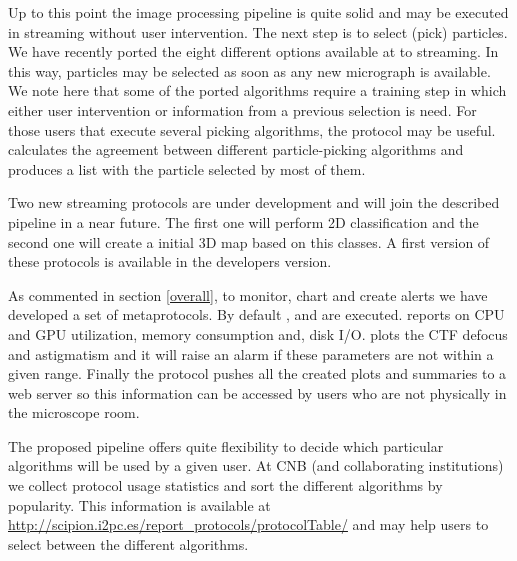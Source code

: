 Up to this point the image processing pipeline is quite solid and may be executed in streaming without user intervention. The next step is to select (pick) particles. We have recently ported the eight different options available at \scipion  to streaming. In this way,  particles may be selected as soon as any new micrograph is available. We note here that some of the ported algorithms require a training step in which either user intervention or information from a previous selection is need. For those users that execute several picking algorithms, the protocol  may be useful.   calculates the agreement between different particle-picking algorithms and produces a list with the particle selected by most of them.

Two new streaming protocols are under development and will join the described  pipeline in a near future. The first one will perform 2D classification and the second one will create a initial 3D map based on this classes. A first version of these protocols is available in the \scipion developers version.

As commented in section \ref{overall}, to monitor, chart and create alerts  we have developed a set of metaprotocols. By default ,  and  are executed.  reports on  CPU and GPU utilization, memory consumption and, disk I/O.  plots the CTF defocus and astigmatism  and it will raise an alarm if these parameters are not within a given range. Finally the  protocol pushes all the created plots and summaries to a web server 
so this information can be accessed by users who are not physically in the microscope room.

The proposed pipeline offers quite flexibility to decide which particular algorithms will be used by a given user. At CNB (and collaborating institutions) we collect protocol usage statistics and sort the different algorithms by popularity.  This information is available at  \url{http://scipion.i2pc.es/report_protocols/protocolTable/} and may help users to select   between the different algorithms.


